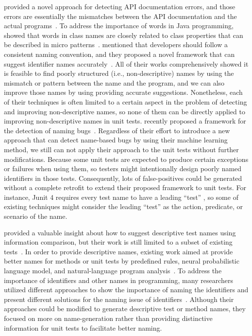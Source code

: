 \citeauthor{zhong2013detecting} provided a novel approach for detecting API documentation errors, and those errors are essentially the mismatches between the API documentation and the actual programs~\cite{zhong2013detecting}.
%
To address the importance of words in Java programming, \citeauthor{singer2008exploiting} showed that words in class names are closely related to class properties that can be described in micro patterns~\cite{singer2008exploiting}.
%
\citeauthor{allamanis2014learning} mentioned that developers should follow a consistent naming convention, and they proposed a novel framework that can suggest identifier names accurately~\cite{allamanis2014learning}.
%
All of their works comprehensively showed it is feasible to find poorly structured (i.e., non-descriptive) names by using the mismatch or pattern between the name and the program, and we can also improve those names by using providing accurate suggestions.
%
Nonetheless, each of their techniques is often limited to a certain aspect in the problem of detecting and improving non-descriptive names, so none of them can be directly applied to improving non-descriptive names in unit tests.
%
\citeauthor{pradel2018deepbugs} recently proposed a framework for the detection of naming bugs~\cite{pradel2018deepbugs}.
%
Regardless of their effort to introduce a new approach that can detect name-based bugs by using their machine learning method, we still can not apply their approach to the unit tests without further modifications.
%
Because some unit tests are expected to produce certain exceptions or failures when using them, so testers might intentionally design poorly named identifiers in those tests.
%
Consequently, lots of false-positives could be generated without a complete retrofit to extend their proposed framework to unit tests.
For instance, Junit 4 requires every test name to have a leading \enquote{test} \cite{JUnit4}, so some of existing techniques might consider the leading \enquote{test} as the action, predicate, or scenario of the name.


 provided a valuable insight about how to suggest descriptive test names using information comparison, but their work is still limited to a subset of existing tests~\cite{wu2020pattern}.
%
In order to provide descriptive names, existing work aimed at provide better names for methods or unit tests by predefined rules, neural probabilistic language model, and natural-language program analysis~\cite{schafer2008sound,zhang2016towards}.
%
To address the importance of identifiers and other names in programming, many researchers utilized different approaches to show the importance of naming the identifiers and present different solutions for the naming issue of identifiers~\cite{takang1996effects,arnaoudova2014repent,lawrie2006s,butler2009relating,butler2010exploring}.
%
Although their approaches could be modified to generate descriptive test or method names, they focused on more on name-generation rather than providing distinctive information for unit tests to facilitate better naming.


